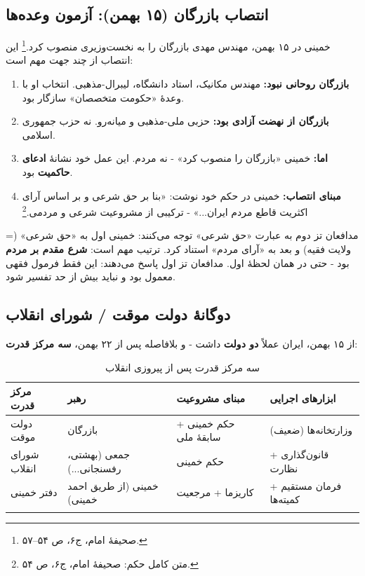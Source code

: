 \documentclass[12pt,a4paper]{book}
\newcommand{\keyword}[1]{\textbf{\textcolor{cPrimary}{#1}}}
\begin{document}
\subsection{انتصاب بازرگان (۱۵ بهمن): آزمون وعده‌ها}

خمینی در ۱۵ بهمن، مهندس مهدی بازرگان را به نخست‌وزیری منصوب کرد.\footnote{صحیفهٔ امام، ج۶، ص ۵۴–۵۷.} این انتصاب از چند جهت مهم است:

\begin{enumerate}[label=\textcolor{cPrimary}{\bfseries\arabic*.}, rightmargin=2em]
    \item \textbf{بازرگان روحانی نبود:} مهندس مکانیک، استاد دانشگاه، لیبرال-مذهبی. انتخاب او با وعدهٔ «حکومت متخصصان» سازگار بود.
    \item \textbf{بازرگان از نهضت آزادی بود:} حزبی ملی-مذهبی و میانه‌رو. نه حزب جمهوری اسلامی.
    \item \textbf{اما:} خمینی «بازرگان را منصوب کرد» - نه مردم. این عمل خود نشانهٔ \keyword{ادعای حاکمیت} بود.
    \item \textbf{مبنای انتصاب:} خمینی در حکم خود نوشت: «بنا بر حق شرعی و بر اساس آرای اکثریت قاطع مردم ایران...» - ترکیبی از مشروعیت شرعی و مردمی.\footnote{متن کامل حکم: صحیفهٔ امام، ج۶، ص ۵۴.}
\end{enumerate}

\begin{warningBox}
مدافعان تز دوم به عبارت «حق شرعی» توجه می‌کنند: خمینی اول به «حق شرعی» (= ولایت فقیه) و بعد به «آرای مردم» استناد کرد. ترتیب مهم است: \keyword{شرع مقدم بر مردم} بود - حتی در همان لحظهٔ اول. مدافعان تز اول پاسخ می‌دهند: این فقط فرمول فقهی معمول بود و نباید بیش از حد تفسیر شود.
\end{warningBox}

\subsection{دوگانهٔ دولت موقت / شورای انقلاب}

از ۱۵ بهمن، ایران عملاً \keyword{دو دولت} داشت - و بلافاصله پس از ۲۲ بهمن، \keyword{سه مرکز قدرت}:

\begin{longtable}{%
    >{\raggedleft\arraybackslash}p{}
    >{\raggedleft\arraybackslash}p{}
    >{\raggedleft\arraybackslash}p{}
    >{\raggedleft\arraybackslash}p{}}
\toprule
\rowcolor{cPrimary!10}
\textbf{مرکز قدرت} & \textbf{رهبر} & \textbf{مبنای مشروعیت} & \textbf{ابزارهای اجرایی} \\
\midrule
\endhead

دولت موقت &
بازرگان &
حکم خمینی + سابقهٔ ملی &
وزارتخانه‌ها (ضعیف) \\
\midrule

شورای انقلاب &
جمعی (بهشتی، رفسنجانی...) &
حکم خمینی &
قانون‌گذاری + نظارت \\
\midrule

دفتر خمینی &
خمینی (از طریق احمد خمینی) &
کاریزما + مرجعیت &
فرمان مستقیم + کمیته‌ها \\

\bottomrule
\caption{سه مرکز قدرت پس از پیروزی انقلاب}
\label{tab:power-centers}
\end{longtable}
\end{document}
